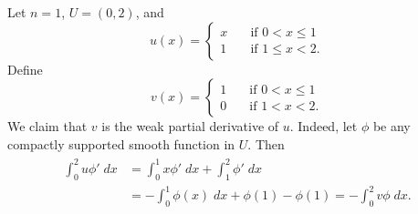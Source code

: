 \documentclass{article}
\numberwithin{equation}{section}
\begin{document}
	
	\begin{example}
		Let $n = 1$, $U = (0,2)$, and 
		\begin{equation*}
			u(x) = 
			\begin{cases}
				x & \quad \text{if $0 < x \leq 1$} \\
				1 &\quad \text{if $1 \leq x < 2$}. 
			\end{cases}
		\end{equation*}
		Define 
		\begin{equation*}
			v(x) = 
			\begin{cases}
				1 &\quad \text{if $0 < x \leq 1$} \\
				0 &\quad \text{if $1 < x < 2$}. 
			\end{cases}
		\end{equation*}
		We claim that $v$ is the weak partial derivative of $u$. Indeed, let $\phi$ be any compactly supported smooth function in $U$. Then 
		\begin{align*}
			\begin{split}
				\int_{0}^{2}u\phi'\;dx &= \int_{0}^{1}x\phi'\;dx + \int_{1}^{2}\phi'\;dx \\
				&= -\int_{0}^{1}\phi(x)\;dx + \phi(1) - \phi(1) = -\int_{0}^{2}v\phi\;dx. 
			\end{split}
		\end{align*}
		\label{ex:example_2.1}
	\end{example}
	
\end{document}
